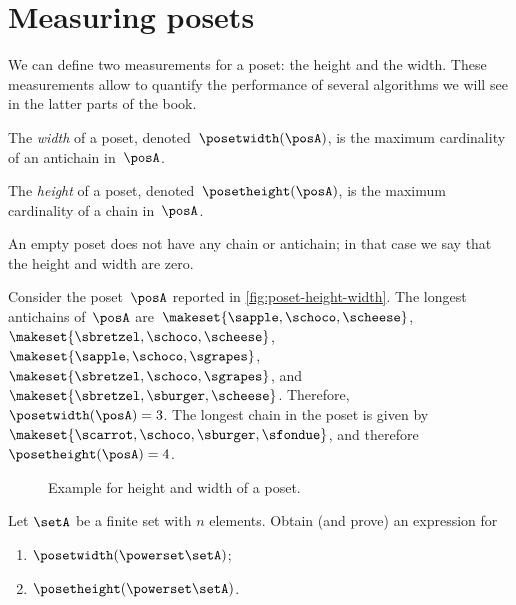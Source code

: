 \section{Measuring posets}
We can define two measurements for a poset: the height and the width.
These measurements allow to quantify the performance of several algorithms we will see in the latter parts of the book.
\begin{definition}
	\label{def:poset-width}
	The \emph{width} of a poset, denoted~$\posetwidth(\posA)$, is the maximum cardinality of an antichain in~$\posA$.
\end{definition}

\begin{definition}
	\label{def:poset-height}
	The \emph{height} of a poset, denoted~$\posetheight(\posA)$, is the maximum cardinality of a chain in~$\posA$.
\end{definition}

An empty poset does not have any chain or antichain; in that case we say that the height and width are zero.

\begin{example}
	Consider the poset~$\posA$ reported in \cref{fig:poset-height-width}.
	The longest antichains of~$\posA$ are~$\makeset{\sapple, \schoco, \scheese}$,~$\makeset{\sbretzel, \schoco, \scheese}$,~$\makeset{\sapple, \schoco, \sgrapes}$,~$\makeset{\sbretzel, \schoco, \sgrapes}$, and~$\makeset{\sbretzel, \sburger, \scheese}$.
	Therefore,~$\posetwidth(\posA)=3$.
	The longest chain in the poset is given by~$\makeset{\scarrot,\schoco,\sburger,\sfondue}$, and therefore~$\posetheight(\posA)=4$.
\end{example}

\begin{figure*}[h]
	\caption{Example for height and width of a poset.
	}
\end{figure*}

\vfill
\begin{gradedexercise}
	Let $\setA$ be a finite set with $n$ elements.
	Obtain (and prove) an expression for
	\begin{enumerate}
		\item $\posetwidth(\powerset  \setA)$;
		\item $\posetheight(\powerset \setA)$.
	\end{enumerate}
\end{gradedexercise}

